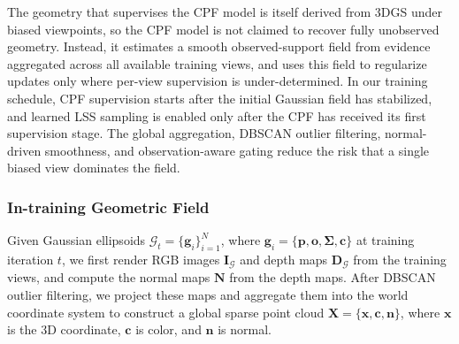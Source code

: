 \documentclass[lettersize,journal]{IEEEtran}
\begin{document}
The geometry that supervises the CPF model is itself derived from 3DGS under biased viewpoints, so the CPF model is not claimed to recover fully unobserved geometry. Instead, it estimates a smooth observed-support field from evidence aggregated across all available training views, and uses this field to regularize updates only where per-view supervision is under-determined. In our training schedule, CPF supervision starts after the initial Gaussian field has stabilized, and learned LSS sampling is enabled only after the CPF has received its first supervision stage. The global aggregation, DBSCAN outlier filtering, normal-driven smoothness, and observation-aware gating reduce the risk that a single biased view dominates the field.


\subsubsection{In-training Geometric Field}

Given Gaussian ellipsoids 
$\mathcal{G}_t = \{\mathbf{g}_i\}_{i=1}^N$, where $\mathbf{g}_i = \{ \mathbf{p}, \mathbf{o}, \mathbf{\Sigma}, \mathbf{c} \}$ 
at training iteration $t$, we first render RGB images $\mathbf{I}_{\mathcal{G}}$ and depth maps $\mathbf{D}_{\mathcal{G}}$ from the training views, and compute the normal maps $\mathbf{N}$ from the depth maps. 
After DBSCAN outlier filtering, 
we project these maps and aggregate them into the world coordinate system to construct a global sparse point cloud $\mathbf{X} = \{ \mathbf{x}, \mathbf{c}, \mathbf{n} \}$, where $\mathbf{x}$ is the 3D coordinate, $\mathbf{c}$ is color, and $\mathbf{n}$ is normal.
\end{document}
